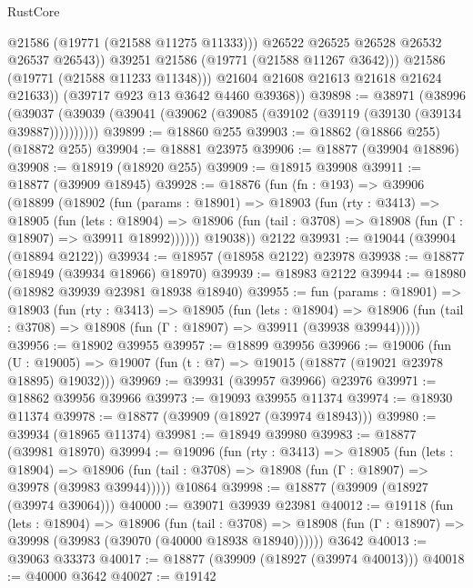 \begin{lexlean}{RustCore}
\begin{coremodule}
                    @21586
                    (@19771 (@21588 @11275 @11333)))
                  @26522
                  @26525
                  @26528
                  @26532
                  @26537
                  @26543))
              @39251
              @21586
              (@19771 (@21588 @11267 @3642)))
            @21586
            (@19771 (@21588 @11233 @11348)))
          @21604
          @21608
          @21613
          @21618
          @21624
          @21633))
      (@39717 @923 @13 @3642 @4460 @39368))
@39898 := @38971
    (@38996 (@39037 (@39039 (@39041 (@39062 (@39085 (@39102 (@39119 (@39130 (@39134 @39887))))))))))
@39899 := @18860 @255
@39903 := @18862 (@18866 @255) (@18872 @255)
@39904 := @18881 @23975
@39906 := @18877 (@39904 @18896)
@39908 := @18919 (@18920 @255)
@39909 := @18915 @39908
@39911 := @18877 (@39909 @18945)
@39928 := @18876
    (fun (fn : @193) =>
    @39906
      (@18899
        (@18902
          (fun (params : @18901) =>
          @18903
            (fun (rty : @3413) =>
            @18905
              (fun (lets : @18904) =>
              @18906 (fun (tail : @3708) => @18908 (fun (Γ : @18907) => @39911 @18992))))))
        @19038))
    @2122
@39931 := @19044 (@39904 (@18894 @2122))
@39934 := @18957 (@18958 @2122) @23978
@39938 := @18877 (@18949 (@39934 @18966) @18970)
@39939 := @18983 @2122
@39944 := @18980 (@18982 @39939 @23981 @18938 @18940)
@39955 := fun (params : @18901) =>
  @18903
    (fun (rty : @3413) =>
    @18905
      (fun (lets : @18904) =>
      @18906 (fun (tail : @3708) => @18908 (fun (Γ : @18907) => @39911 (@39938 @39944)))))
@39956 := @18902 @39955
@39957 := @18899 @39956
@39966 := @19006
    (fun (U : @19005) => @19007 (fun (t : @7) => @19015 (@18877 (@19021 @23978 @18895) @19032)))
@39969 := @39931 (@39957 @39966) @23976
@39971 := @18862 @39956 @39966
@39973 := @19093 @39955 @11374
@39974 := @18930 @11374
@39978 := @18877 (@39909 (@18927 (@39974 @18943)))
@39980 := @39934 (@18965 @11374)
@39981 := @18949 @39980
@39983 := @18877 (@39981 @18970)
@39994 := @19096
    (fun (rty : @3413) =>
    @18905
      (fun (lets : @18904) =>
      @18906 (fun (tail : @3708) => @18908 (fun (Γ : @18907) => @39978 (@39983 @39944)))))
    @10864
@39998 := @18877 (@39909 (@18927 (@39974 @39064)))
@40000 := @39071 @39939 @23981
@40012 := @19118
    (fun (lets : @18904) =>
    @18906
      (fun (tail : @3708) =>
      @18908 (fun (Γ : @18907) => @39998 (@39983 (@39070 (@40000 @18938 @18940))))))
    @3642
@40013 := @39063 @33373
@40017 := @18877 (@39909 (@18927 (@39974 @40013)))
@40018 := @40000 @3642
@40027 := @19142

\end{coremodule}
\end{lexlean}

